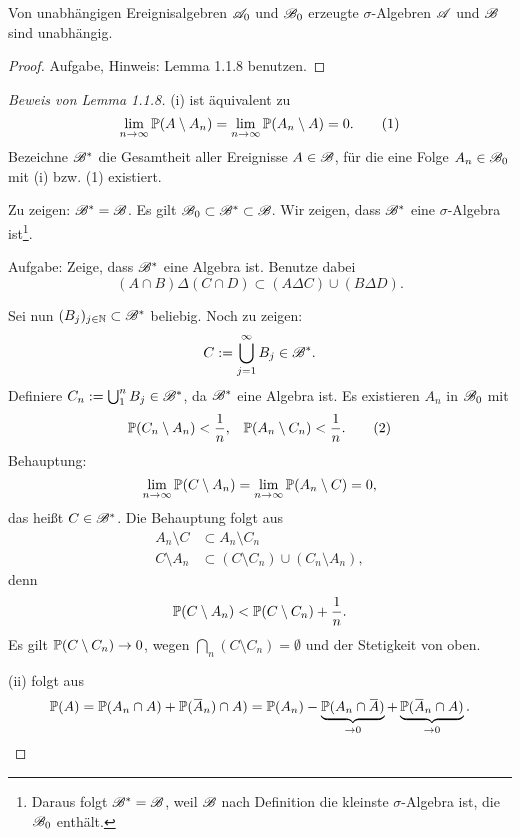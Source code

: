 \begin{thm}
  Von unabhängigen Ereignisalgebren $\mathscr{A}_0$ und $\mathscr{B}_0$ erzeugte
  $\sigma$-Algebren $\mathscr{A}$ und $\mathscr{B}$ sind unabhängig.
\end{thm}

\begin{proof}
  Aufgabe, Hinweis: Lemma 1.1.8 benutzen.
\end{proof}

\begin{proof}[Beweis von Lemma 1.1.8]
  (i) ist äquivalent zu
  \[ \lim_{n \to \infty} \mathbb{P}( A \setminus A_n) = \lim_{n \to \infty} \mathbb{P}( A_n
    \setminus A ) = 0. \tag{1} \]
  Bezeichne $\mathscr{B}^*$ die Gesamtheit aller Ereignisse $A \in \mathscr{B}$, für die eine
  Folge $A_n \in \mathscr{B}_0$ mit (i) bzw. (1) existiert.

  Zu zeigen: $\mathscr{B}^* = \mathscr{B}$. Es gilt $\mathscr{B}_0 \subset \mathscr{B}^* \subset \mathscr{B}$. Wir
  zeigen, dass $\mathscr{B}^*$ eine $\sigma$-Algebra ist\footnote{%
    Daraus folgt $\mathscr{B}^* = \mathscr{B}$, weil $\mathscr{B}$ nach Definition die kleinste
    $\sigma$-Algebra ist, die $\mathscr{B}_0$ enthält.}.

  Aufgabe: Zeige, dass $\mathscr{B}^*$ eine Algebra ist. Benutze dabei
  \[ (A \cap B) \Delta (C \cap D) \subset (A \Delta C) \cup (B \Delta D). \]

  Sei nun $(B_j)_{j \in \mathbb{N}} \subset \mathscr{B}^*$ beliebig. Noch zu zeigen:
  \[ C := \bigcup_{j=1}^\infty  B_j \in \mathscr{B}^*. \]
  Definiere $C_n := \bigcup_1^n B_j \in \mathscr{B}^*$, da $\mathscr{B}^*$ eine Algebra ist. Es
  existieren $A_n$ in $\mathscr{B}_0$ mit
  \begin{align*}
    \mathbb{P}( C_n \setminus A_n ) &< \frac{1}{n}, & \mathbb{P}(A_n \setminus C_n ) < \frac{1}{n}. \tag{2}
  \end{align*}
  Behauptung:
  \[ \lim_{n \to \infty} \mathbb{P}( C \setminus A_n ) = \lim_{n \to \infty} \mathbb{P}( A_n
    \setminus C ) = 0, \]
  das heißt $C \in \mathscr{B}^*$. Die Behauptung folgt aus
  \begin{align*}
    A_n \setminus C &\subset A_n \setminus C_n \\
    C \setminus A_n &\subset ( C\setminus C_n ) \cup (C_n \setminus A_n),
  \end{align*}
  denn
  \[ \mathbb{P}( C \setminus A_n ) < \mathbb{P}( C \setminus C_n ) + \frac{1}{n}. \]
  Es gilt $\mathbb{P}( C \setminus C_n ) \to 0$, wegen $\bigcap_n(C \setminus C_n) =
  \emptyset$ und der Stetigkeit von oben.

  (ii) folgt aus
  \[ \pP(A) = \pP( A_n \cap A ) + \pP( \obar{A}_n ) \cap A ) = \pP(A_n) -
    \underbrace{\pP( A_n \cap \obar{A} )}_{\to 0} +
    \underbrace{\pP( \obar{A}_n \cap A )}_{\to 0}. \qedhere \]
\end{proof}

